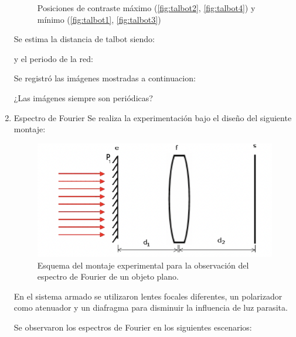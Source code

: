 \documentclass{./packages/optica-article}
\begin{document}
\begin{enumerate}
\begin{figure}[hptb]
\begin{center}
	
	
\caption{Posiciones de contraste máximo (\ref{fig:talbot2}, \ref{fig:talbot4}) y mínimo (\ref{fig:talbot1}, \ref{fig:talbot3})%
	}
	\label{fig:alltalbot}
\end{center}
\end{figure}

Se estima la distancia de talbot siendo:

y el periodo de la red: 


Se registró las imágenes mostradas a continuacion:

¿Las imágenes siempre son periódicas?



    \item Espectro de Fourier
Se realiza la experimentación bajo el diseño del siguiente montaje:

\begin{figure}[h]
    \centering
    \includegraphics[scale=1]{sistemaespectrodefourier.png}
    \caption{Esquema del montaje experimental para la observación del espectro de Fourier de un objeto plano. }
    \label{fouriersistema}
    \end{figure}

En el sistema armado se utilizaron lentes focales diferentes, un polarizador como atenuador y un diafragma para disminuir la influencia de luz parasita.

Se observaron los espectros de Fourier en los siguientes escenarios: 


\end{enumerate}
\end{document}
